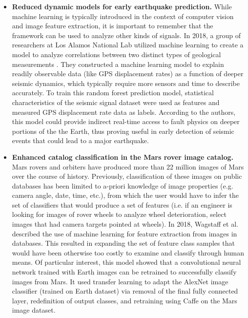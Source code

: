 \documentclass[twoside]{article}
\begin{document}
\begin{itemize}
\item \textbf{Reduced dynamic models for early earthquake prediction.}
While machine learning is typically introduced in the context of computer vision and image feature extraction, it is important to remember that the framework can be used to analyze other kinds of signals. In 2018, a group of researchers at Los Alamos National Lab utilized machine learning to create a model to analyze correlations between two distinct types of geological measurements \cite{rouet2019continuous}. They constructed a machine learning model to explain readily observable data (like GPS displacement rates) as a function of deeper seismic dynamics, which typically require more sensors and time to describe accurately. To train this random forest prediction model, statistical characteristics of the seismic signal dataset were used as features and measured GPS displacement rate data as labels. According to the authors, this model could provide indirect real-time access to fault physics on deeper portions of the the Earth, thus proving useful in early detection of seismic events that could lead to a major earthquake.

\item \textbf{Enhanced catalog classification in the Mars rover image catalog.}
Mars rovers and orbiters have produced more than 22 million images of Mars over the course of history. Previously, classification of these images on public databases has been limited to a-priori knowledge of image properties (e.g. camera angle, date, time, etc.), from which the user would have to infer the set of classifiers that would produce a set of features (i.e. if an engineer is looking for images of rover wheels to analyze wheel deterioration, select images that had camera targets pointed at wheels). In 2018, Wagstaff et al. \cite{wagstaff2018deep} described the use of machine learning for feature extraction from images in databases. This resulted in expanding the set of feature class samples that would have been otherwise too costly to examine and classify through human means. Of particular interest, this model showed that a convolutional neural network trained with Earth images can be retrained to successfully classify images from Mars. It used transfer learning to adapt the AlexNet image classifier (trained on Earth dataset) via removal of the final fully connected layer, redefinition of output classes, and retraining using Caffe on the Mars image dataset.
\end{itemize}
\end{document}
